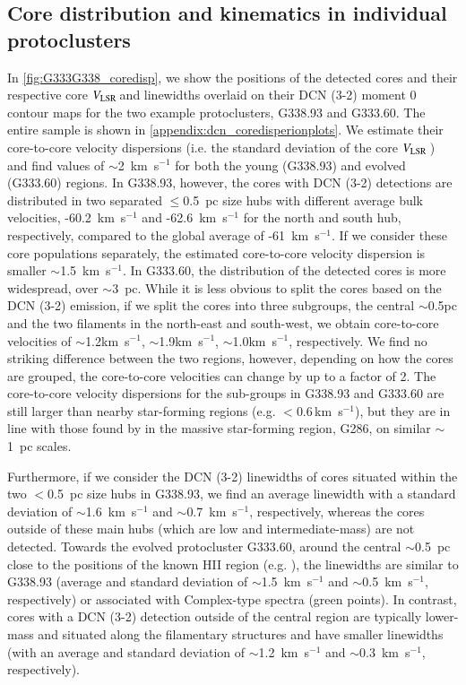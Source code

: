 \documentclass[longauth]{aa} %
\newcommand{\vlsr}{\mbox{$V_{\rm LSR}$\,}}
\newcommand{\kms}{\textrm{km~s}\ensuremath{^{-1}}\xspace}       %
\begin{document}
\subsection{Core distribution and kinematics in individual protoclusters\label{sec:core_dist_individual}}
In \cref{fig:G333G338_coredisp}, we show the positions of the detected cores and their respective core \vlsr and linewidths overlaid on their DCN (3-2) moment 0 contour maps for the two example protoclusters, G338.93 and G333.60. The entire sample is shown in \cref{appendix:dcn_coredisperionplots}. We estimate their core-to-core velocity dispersions (i.e. the standard deviation of the core \vlsr) and find values of $\sim$2~\kms for both the young (G338.93) and evolved (G333.60) regions. In G338.93, however, the cores with DCN (3-2) detections are distributed in two separated $\leq$0.5~pc size hubs with different average bulk velocities, -60.2~\kms and -62.6~\kms for the north and south hub, respectively, compared to the global average of -61~\kms. If we consider these core populations separately, the estimated core-to-core velocity dispersion is smaller $\sim$1.5~\kms. In G333.60, the distribution of the detected cores is more widespread, over $\sim$3~pc. While it is less obvious to split the cores based on the DCN (3-2) emission, if we split the cores into three subgroups, the central $\sim$0.5pc and the two filaments in the north-east and south-west, we obtain core-to-core velocities of $\sim$1.2\kms, $\sim$1.9\kms, $\sim$1.0\kms, respectively. We find no striking difference between the two regions, however, depending on how the cores are grouped, the core-to-core velocities can change by up to a factor of 2. The core-to-core velocity dispersions for the sub-groups in G338.93 and G333.60 are still larger than nearby star-forming regions (e.g. $<$0.6\,\kms \citealt{Kirk2010}), but they are in line with those found by \citet{Cheng2020} in the massive star-forming region, G286, on similar $\sim$1~pc scales.


Furthermore, if we consider the DCN (3-2) linewidths of cores situated within the two $<$0.5~pc size hubs in G338.93, we find an average linewidth with a standard deviation of $\sim$1.6~\kms and $\sim$0.7~\kms, respectively, whereas the cores outside of these main hubs (which are low and intermediate-mass) are not detected. Towards the evolved protocluster G333.60, around the central $\sim$0.5~pc close to the positions of the known HII region (e.g. \citealt{Fujiyoshi2006}), the linewidths are similar to G338.93 (average and standard deviation of $\sim$1.5~\kms and $\sim$0.5~\kms, respectively) or associated with Complex-type spectra (green points). In contrast, cores with a DCN (3-2) detection outside of the central region are typically lower-mass and situated along the filamentary structures and have smaller linewidths (with an average and standard deviation of $\sim$1.2~\kms and $\sim$0.3~\kms, respectively).  
\end{document}
